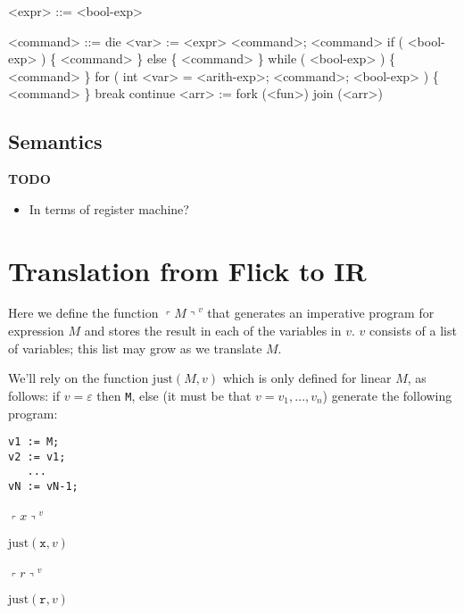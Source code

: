 \documentclass{article}
\newenvironment{todo}{\begin{mdframed}[backgroundcolor=gray!20]\bf TODO \begin{itemize}}{\end{itemize}\end{mdframed}}
\newcommand{\q}[1]{\ensuremath{\left\ulcorner #1\right\urcorner}}
\begin{document}
\begin{grammar}

  <expr> ::= <bool-exp>

\end{grammar}

\begin{grammar}

  <command> ::= die
  \alt <var> := <expr>
  \alt <command>; <command>
  \alt if ( <bool-exp> ) \{ <command> \} else \{ <command> \}
  \alt while ( <bool-exp> ) \{ <command> \}
  \alt for ( int <var> = <arith-exp>; <command>; <bool-exp> ) \{ <command> \}
  \alt break
  \alt continue
  \alt <arr> := fork (<fun>)
  \alt join (<arr>)

\end{grammar}

\subsection{Semantics}
\begin{todo}
\item In terms of register machine?
\end{todo}

\section{Translation from Flick to IR}
Here we define the function $\q{M}^v$ that generates an imperative program for
expression $M$ and stores the result in each of the variables in $v$. $v$
consists of a list of variables; this list may grow as we translate $M$.

We'll rely on the function $\mathrm{just}(M, v)$ which is only defined for
linear $M$, as follows: if $v = \varepsilon$ then \texttt{M}, else (it must be that $v =
v_1,\ldots,v_n$) generate the following program:
\hfill\begin{minipage}{\textwidth}
\begin{verbatim}
v1 := M;
v2 := v1;
   ...
vN := vN-1;
\end{verbatim}
\end{minipage}

\paragraph{$\q{x}^v$  } $\mathrm{just}(\mathtt{x}, v)$

\paragraph{$\q{r}^v$  } $\mathrm{just}(\mathtt{r}, v)$
\end{document}
